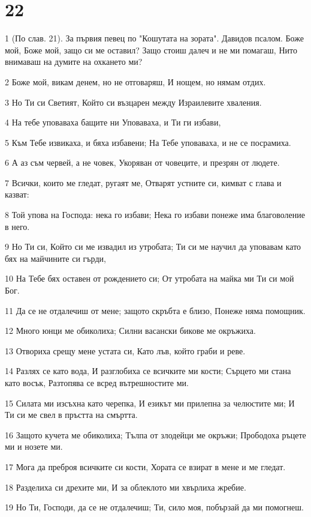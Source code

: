 \chapter{22}

\par 1 (По слав. 21). За първия певец по "Кошутата на зората". Давидов псалом. Боже мой, Боже мой, защо си ме оставил? Защо стоиш далеч и не ми помагаш, Нито внимаваш на думите на охкането ми?
\par 2 Боже мой, викам денем, но не отговаряш, И нощем, но нямам отдих.
\par 3 Но Ти си Светият, Който си възцарен между Израилевите хваления.
\par 4 На тебе уповаваха бащите ни Уповаваха, и Ти ги избави,
\par 5 Към Тебе извикаха, и бяха избавени; На Тебе уповаваха, и не се посрамиха.
\par 6 А аз съм червей, а не човек, Укоряван от човеците, и презрян от людете.
\par 7 Всички, които ме гледат, ругаят ме, Отварят устните си, кимват с глава и казват:
\par 8 Той упова на Господа: нека го избави; Нека го избави понеже има благоволение в него.
\par 9 Но Ти си, Който си ме извадил из утробата; Ти си ме научил да уповавам като бях на майчините си гърди,
\par 10 На Тебе бях оставен от рождението си; От утробата на майка ми Ти си мой Бог.
\par 11 Да се не отдалечиш от мене; защото скръбта е близо, Понеже няма помощник.
\par 12 Много юнци ме обиколиха; Силни васански бикове ме окръжиха.
\par 13 Отвориха срещу мене устата си, Като лъв, който граби и реве.
\par 14 Разлях се като вода, И разглобиха се всичките ми кости; Сърцето ми стана като восък, Разтопява се всред вътрешностите ми.
\par 15 Силата ми изсъхна като черепка, И езикът ми прилепна за челюстите ми; И Ти си ме свел в пръстта на смъртта.
\par 16 Защото кучета ме обиколиха; Тълпа от злодейци ме окръжи; Прободоха ръцете ми и нозете ми.
\par 17 Мога да преброя всичките си кости, Хората се взират в мене и ме гледат.
\par 18 Разделиха си дрехите ми, И за облеклото ми хвърлиха жребие.
\par 19 Но Ти, Господи, да се не отдалечиш; Ти, сило моя, побързай да ми помогнеш.
